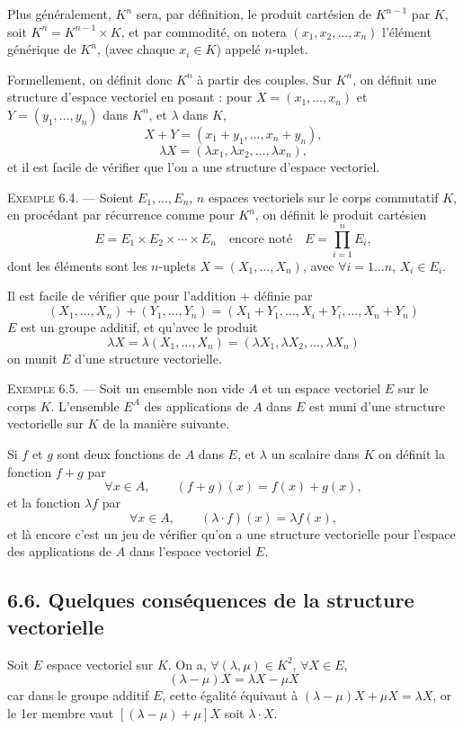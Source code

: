 Plus généralement, $K^n$ sera, par définition, le produit cartésien de $K^{n-1}$ par $K$, soit $K^n=K^{n-1}\times K$, et par commodité, on notera $(x_1,x_2,\ldots,x_n)$ l'élément générique de $K^n$, (avec chaque $x_i\in K$) appelé $n$-uplet.

Formellement, on définit donc $K^n$ à partir des couples. Sur $K^n$, on définit une structure d'espace vectoriel en posant : pour $X=(x_1,\ldots,x_n)$ et $Y=(y_1,\ldots,y_n)$ dans $K^n$, et $\lambda$ dans $K$,
\[
X+Y=(x_1+y_1,\ldots,x_n+y_n),
\]
\[
\lambda X=(\lambda x_1,\lambda x_2,\ldots,\lambda x_n),
\]
et il est facile de vérifier que l'on a une structure d'espace vectoriel.

\medskip\noindent\textsc{Exemple 6.4.} --- Soient $E_1,\ldots,E_n$, $n$ espaces vectoriels sur le corps commutatif $K$, en procédant par récurrence comme pour $K^n$, on définit le produit cartésien
\[
E=E_1\times E_2\times\cdots\times E_n\quad\text{encore noté}\quad E=\prod_{i=1}^n E_i,
\]
dont les éléments sont les $n$-uplets $X=(X_1,\ldots,X_n)$, avec $\forall i=1\ldots n$, $X_i\in E_i$.

Il est facile de vérifier que pour l'addition $+$ définie par
\[
(X_1,\ldots,X_n)+(Y_1,\ldots,Y_n)=(X_1+Y_1,\ldots,X_i+Y_i,\ldots,X_n+Y_n)
\]
$E$ est un groupe additif, et qu'avec le produit
\[
\lambda X=\lambda(X_1,\ldots,X_n)=(\lambda X_1,\lambda X_2,\ldots,\lambda X_n)
\]
on munit $E$ d'une structure vectorielle.

\medskip\noindent\textsc{Exemple 6.5.} --- Soit un ensemble non vide $A$ et un espace vectoriel $E$ sur le corps $K$. L'ensemble $E^A$ des applications de $A$ dans $E$ est muni d'une structure vectorielle sur $K$ de la manière suivante.

Si $f$ et $g$ sont deux fonctions de $A$ dans $E$, et $\lambda$ un scalaire dans $K$ on définit la fonction $f+g$ par
\[
\forall x\in A,\qquad (f+g)(x)=f(x)+g(x),
\]
et la fonction $\lambda f$ par
\[
\forall x\in A,\qquad (\lambda\cdot f)(x)=\lambda f(x),
\]
et là encore c'est un jeu de vérifier qu'on a une structure vectorielle pour l'espace des applications de $A$ dans l'espace vectoriel $E$.

\subsection*{6.6. Quelques conséquences de la structure vectorielle}

Soit $E$ espace vectoriel sur $K$. On a, $\forall(\lambda,\mu)\in K^2$, $\forall X\in E$,
\[
(\lambda-\mu)X=\lambda X-\mu X
\]
car dans le groupe additif $E$, cette égalité équivaut à $(\lambda-\mu)X+\mu X=\lambda X$, or le 1er membre vaut $[(\lambda-\mu)+\mu]X$ soit $\lambda\cdot X$. \bookend

